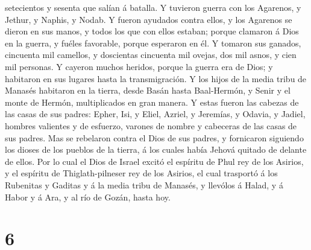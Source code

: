 setecientos y sesenta que salían á batalla.  Y tuvieron
guerra con los Agarenos, y Jethur, y Naphis, y Nodab.  Y
fueron ayudados contra ellos, y los Agarenos se dieron en sus manos, y
todos los que con ellos estaban; porque clamaron á Dios en la guerra, y
fuéles favorable, porque esperaron en él.  Y tomaron sus
ganados, cincuenta mil camellos, y doscientas cincuenta mil ovejas, dos
mil asnos, y cien mil personas.  Y cayeron muchos
heridos, porque la guerra era de Dios; y habitaron en sus lugares hasta
la transmigración.  Y los hijos de la media tribu de
Manasés habitaron en la tierra, desde Basán hasta Baal-Hermón, y Senir y
el monte de Hermón, multiplicados en gran manera.  Y
estas fueron las cabezas de las casas de sus padres: Epher, Isi, y
Eliel, Azriel, y Jeremías, y Odavia, y Jadiel, hombres valientes y de
esfuerzo, varones de nombre y cabeceras de las casas de sus padres.
 Mas se rebelaron contra el Dios de sus padres, y
fornicaron siguiendo los dioses de los pueblos de la tierra, á los
cuales había Jehová quitado de delante de ellos.  Por lo
cual el Dios de Israel excitó el espíritu de Phul rey de los Asirios, y
el espíritu de Thiglath-pilneser rey de los Asirios, el cual trasportó á
los Rubenitas y Gaditas y á la media tribu de Manasés, y llevólos á
Halad, y á Habor y á Ara, y al río de Gozán, hasta hoy.

\hypertarget{section-5}{%
\section{6}\label{section-5}}

